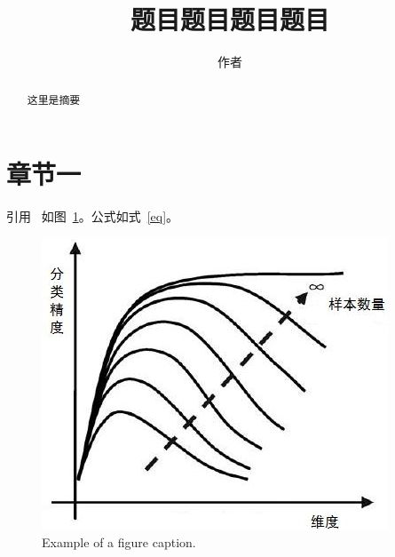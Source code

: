 \documentclass[UTF8,AutoFakeBold,a4paper,12pt]{article}
\begin{document}
\title{题目题目题目题目}
\author{作者}
\maketitle

\begin{abstract}
    这里是摘要
\end{abstract}
\begin{keyword}
\end{keyword}
\toggletrue{abstractEN}
\begin{abstract}
\end{abstract}
\begin{keyword}
\end{keyword}
\tableofcontents


\section{章节一}
引用~\cite{example11}
如图~\ref{fig}。公式如式~\ref{eq}。
\begin{figure}[htbp]
    \centerline{\includegraphics{fig1.jpg}}
    \caption{Example of a figure caption.}
    \label{fig}
\end{figure}
\end{document}
